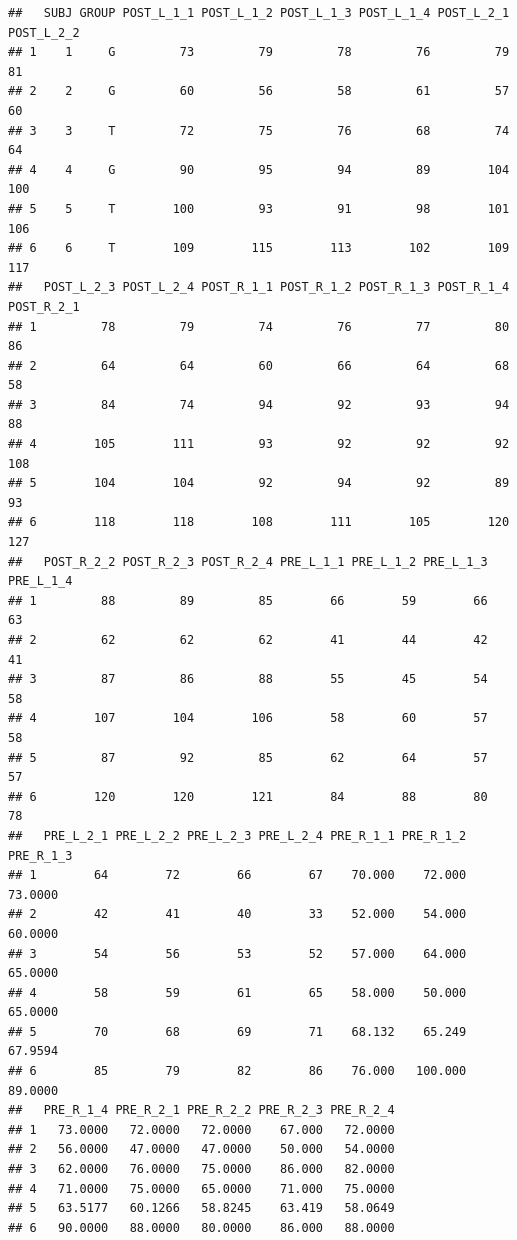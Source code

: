 \documentclass[
]{book}
\begin{document}
\begin{verbatim}
##   SUBJ GROUP POST_L_1_1 POST_L_1_2 POST_L_1_3 POST_L_1_4 POST_L_2_1 POST_L_2_2
## 1    1     G         73         79         78         76         79         81
## 2    2     G         60         56         58         61         57         60
## 3    3     T         72         75         76         68         74         64
## 4    4     G         90         95         94         89        104        100
## 5    5     T        100         93         91         98        101        106
## 6    6     T        109        115        113        102        109        117
##   POST_L_2_3 POST_L_2_4 POST_R_1_1 POST_R_1_2 POST_R_1_3 POST_R_1_4 POST_R_2_1
## 1         78         79         74         76         77         80         86
## 2         64         64         60         66         64         68         58
## 3         84         74         94         92         93         94         88
## 4        105        111         93         92         92         92        108
## 5        104        104         92         94         92         89         93
## 6        118        118        108        111        105        120        127
##   POST_R_2_2 POST_R_2_3 POST_R_2_4 PRE_L_1_1 PRE_L_1_2 PRE_L_1_3 PRE_L_1_4
## 1         88         89         85        66        59        66        63
## 2         62         62         62        41        44        42        41
## 3         87         86         88        55        45        54        58
## 4        107        104        106        58        60        57        58
## 5         87         92         85        62        64        57        57
## 6        120        120        121        84        88        80        78
##   PRE_L_2_1 PRE_L_2_2 PRE_L_2_3 PRE_L_2_4 PRE_R_1_1 PRE_R_1_2 PRE_R_1_3
## 1        64        72        66        67    70.000    72.000   73.0000
## 2        42        41        40        33    52.000    54.000   60.0000
## 3        54        56        53        52    57.000    64.000   65.0000
## 4        58        59        61        65    58.000    50.000   65.0000
## 5        70        68        69        71    68.132    65.249   67.9594
## 6        85        79        82        86    76.000   100.000   89.0000
##   PRE_R_1_4 PRE_R_2_1 PRE_R_2_2 PRE_R_2_3 PRE_R_2_4
## 1   73.0000   72.0000   72.0000    67.000   72.0000
## 2   56.0000   47.0000   47.0000    50.000   54.0000
## 3   62.0000   76.0000   75.0000    86.000   82.0000
## 4   71.0000   75.0000   65.0000    71.000   75.0000
## 5   63.5177   60.1266   58.8245    63.419   58.0649
## 6   90.0000   88.0000   80.0000    86.000   88.0000
\end{verbatim}
\end{document}
